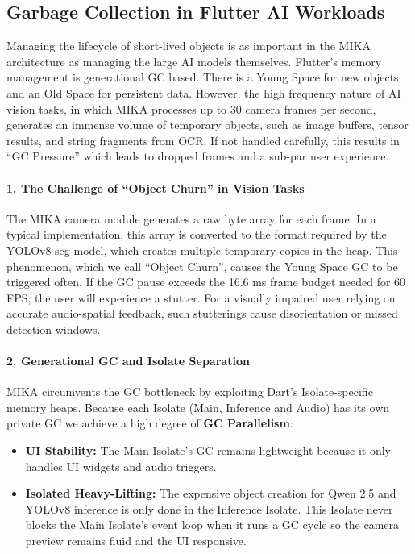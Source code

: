 \documentclass[12pt,a4paper]{report}
\begin{document}
\subsection{Garbage Collection in Flutter AI Workloads}
 
Managing the lifecycle of short-lived objects is as important in the MIKA architecture as managing the large AI models themselves.  Flutter’s memory management is generational GC based. There is a Young Space for new objects and an Old Space for persistent data. However, the high frequency nature of AI vision tasks, in which MIKA processes up to 30 camera frames per second, generates an immense volume of temporary objects, such as image buffers, tensor results, and string fragments from OCR. If not handled carefully, this results in “GC Pressure” which leads to dropped frames and a sub-par user experience. 
\paragraph{1. The Challenge of ``Object Churn'' in Vision Tasks}
The MIKA camera module generates a raw byte array for each frame. In a typical implementation, this array is converted to the format required by the YOLOv8-seg model, which creates multiple temporary copies in the heap. This phenomenon, which we call “Object Churn”, causes the Young Space GC to be triggered often. If the GC pause exceeds the 16.6 ms frame budget needed for 60 FPS, the user will experience a stutter. For a visually impaired user relying on accurate audio-spatial feedback, such stutterings cause disorientation or missed detection windows. 
\paragraph{2. Generational GC and Isolate Separation}
MIKA circumvents the GC bottleneck by exploiting Dart’s Isolate-specific memory heaps. Because each Isolate (Main, Inference and Audio) has its own private GC we achieve a high degree of \textbf{GC Parallelism}:
\begin{itemize}
    \item \textbf{UI Stability:} The Main Isolate’s GC remains lightweight because it only handles UI widgets and audio triggers.
    \item \textbf{Isolated Heavy-Lifting:} The expensive object creation for Qwen 2.5 and YOLOv8 inference is only done in the Inference Isolate. This Isolate never blocks the Main Isolate's event loop when it runs a GC cycle so the camera preview remains fluid and the UI responsive.
\end{itemize}
 
\end{document}
